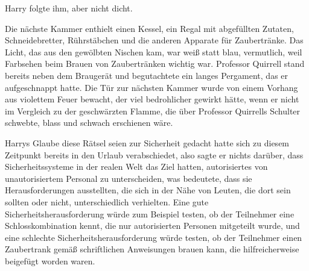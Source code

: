 Harry folgte ihm, aber nicht dicht.

\later

Die nächste Kammer enthielt einen Kessel, ein Regal mit abgefüllten Zutaten, Schneidebretter, Rührstäbchen und die anderen Apparate für Zaubertränke. Das Licht, das aus den gewölbten Nischen kam, war weiß statt blau, vermutlich, weil Farbsehen beim Brauen von Zaubertränken wichtig war.
Professor Quirrell stand bereits neben dem Braugerät und begutachtete ein langes Pergament, das er aufgeschnappt hatte. Die Tür zur nächsten Kammer wurde von einem Vorhang aus violettem Feuer bewacht, der viel bedrohlicher gewirkt hätte, wenn er nicht im Vergleich zu der geschwärzten Flamme, die über Professor Quirrells Schulter schwebte, blass und schwach erschienen wäre.

Harrys Glaube diese Rätsel seien zur Sicherheit gedacht hatte sich zu diesem Zeitpunkt bereits in den Urlaub verabschiedet, also sagte er nichts darüber, dass Sicherheitssysteme in der realen Welt das Ziel hatten, autorisiertes von unautorisiertem Personal zu unterscheiden, was bedeutete, dass sie Herausforderungen ausstellten, die sich in der Nähe von Leuten, die dort sein sollten oder nicht, unterschiedlich verhielten. Eine gute Sicherheitsherausforderung würde zum Beispiel testen, ob der Teilnehmer eine Schlosskombination kennt, die nur autorisierten Personen mitgeteilt wurde, und eine schlechte Sicherheitsherausforderung würde testen, ob der Teilnehmer einen Zaubertrank gemäß schriftlichen Anweisungen brauen kann, die hilfreicherweise beigefügt worden waren.

